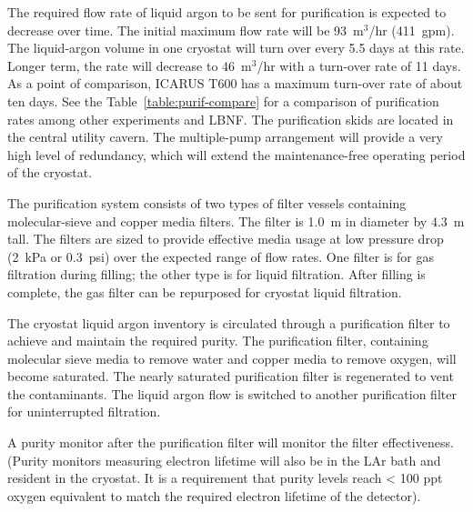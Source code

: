 The required flow rate of liquid argon to be sent for purification 
is expected to decrease over time. The initial maximum flow rate 
will be 93~m$^3$/hr (411~gpm). The liquid-argon volume in one 
cryostat will turn over every 5.5 days at this rate. 
Longer term, the rate will decrease to 46~m$^3$/hr 
with a turn-over rate of 11 days.  As a point of comparison, ICARUS 
T600 has a maximum turn-over rate of about ten days. See the 
Table~\ref{table:purif-compare} for a comparison of purification 
rates among other experiments and LBNF. 
The purification skids are located in the central utility cavern.  
The multiple-pump arrangement will provide a very 
high level of redundancy, which will extend the maintenance-free 
operating period of the cryostat.  


The purification system consists of two types of filter vessels containing
 molecular-sieve and copper media filters. The filter is 1.0~m in 
diameter by 4.3~m tall. The filters are sized to provide effective 
media usage at low pressure drop (2~kPa or 0.3~psi) over the 
expected range of flow rates. One filter is for gas filtration 
during filling; the other type is for liquid filtration. After filling 
is complete, the gas filter can be repurposed for cryostat 
liquid filtration.

The cryostat liquid argon inventory is circulated through a purification 
filter to achieve and maintain the required purity. The purification filter,
 containing molecular sieve media to remove water and copper media to 
remove oxygen, will become saturated. The nearly saturated purification 
filter is regenerated to vent the contaminants. The liquid argon flow 
is switched to another purification filter for uninterrupted filtration. 

A purity monitor after the purification filter will monitor the filter 
effectiveness. (Purity monitors measuring electron lifetime will also 
be in the LAr bath and resident in the cryostat. It is a requirement 
that purity levels reach < 100 ppt oxygen equivalent to match the 
required electron lifetime of the detector). 

